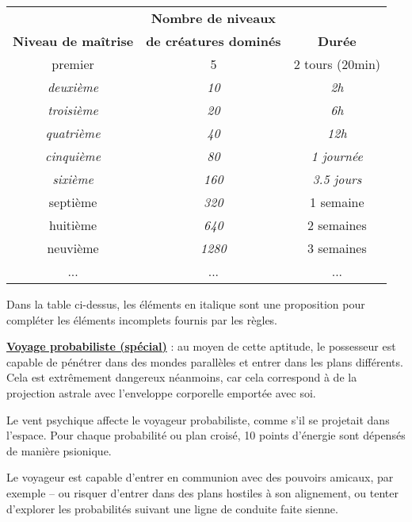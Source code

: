 \begin{tabular}{ccc}
                                 &\textbf{Nombre de niveaux} &\\
\textbf{Niveau de maîtrise}      & \textbf{de créatures dominés} & \textbf{Durée} \\
premier             & 5     & 2 tours (20min)      \\
\textit{deuxième}            & \textit{10}    & \textit{2h}                    \\
\textit{troisième}           & \textit{20}    & \textit{6h}                    \\
\textit{quatrième}           & \textit{40}    & \textit{12h}                   \\
\textit{cinquième}           & \textit{80}    & \textit{1 journée}                \\
\textit{sixième}             & \textit{160}   & \textit{3.5 jours} \\
septième   & \textit{320}   & 1 semaine \\
huitième            & \textit{640}   & 2 semaines \\
neuvième            & \textit{1280}  & 3 semaines \\
... & ... & ...
\end{tabular}

\bigskip

Dans la table ci-dessus, les éléments en italique sont une proposition pour compléter les éléments incomplets fournis par les règles.

\bigskip

\textbf{\uline{Voyage probabiliste (spécial)}} : au moyen de cette aptitude, le possesseur est capable de pénétrer dans des mondes parallèles et entrer dans les plans différents. Cela est extrêmement dangereux néanmoins, car cela correspond à de la projection astrale avec l'enveloppe corporelle emportée avec soi.

\bigskip

Le vent psychique affecte le voyageur probabiliste, comme s'il se projetait dans l'espace. Pour chaque probabilité ou plan croisé, 10 points d'énergie sont dépensés de manière psionique.

\bigskip

Le voyageur est capable d'entrer en communion avec des pouvoirs amicaux, par exemple -- ou risquer d'entrer dans des plans hostiles à son alignement, ou tenter d'explorer les probabilités suivant une ligne de conduite faite sienne.

